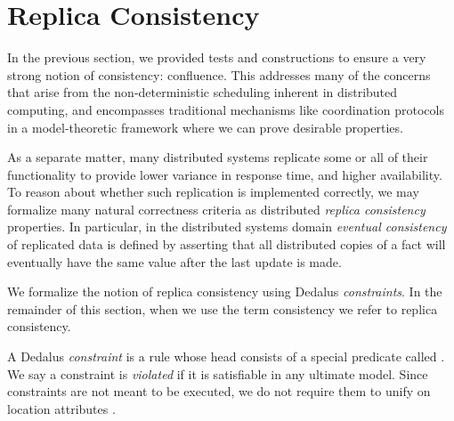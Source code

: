 \section{Replica Consistency}
\label{sec:consistency}

In the previous section, we provided tests and constructions to ensure a very strong notion of consistency: confluence.  This addresses many of the concerns that arise from the non-deterministic scheduling inherent in distributed computing, and encompasses traditional mechanisms like coordination protocols in a model-theoretic framework where we can prove desirable properties.

As a separate matter, many distributed systems replicate some or all of their functionality to provide lower variance in response time, and higher availability.  
To reason about whether such replication is implemented correctly, we may formalize many
natural correctness criteria as distributed {\em replica consistency} properties.
In particular, in the distributed systems domain {\em eventual consistency} of replicated data is defined by asserting that all distributed copies of a fact will eventually have the same value after the last update is made. 


We formalize the notion of replica consistency using Dedalus {\em constraints}.  In the remainder of this section, when we use the term consistency we refer to replica consistency.

\begin{definition}
A Dedalus {\em constraint} is a rule whose head consists of a special predicate called .  We say a constraint is {\em violated} if it is satisfiable in any ultimate model.  Since constraints are not meant to be executed, we do not require them to unify on location attributes .  
\end{definition}

